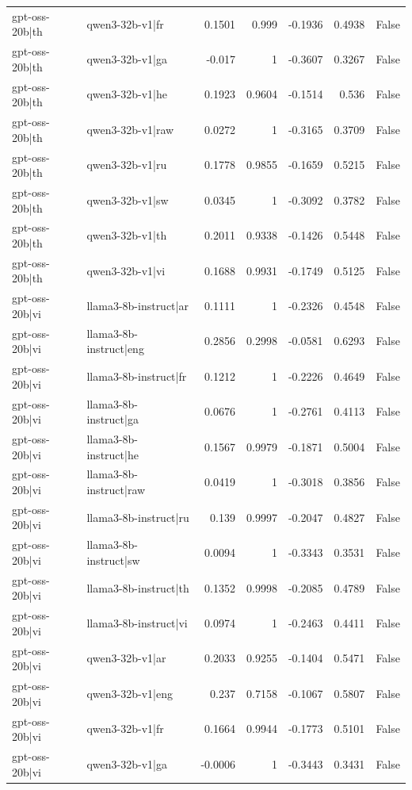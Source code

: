 \begin{table}
\begin{tabular}{l l r r r r l}
gpt-oss-20b|th & qwen3-32b-v1|fr & 0.1501 & 0.999 & -0.1936 & 0.4938 & False \\
gpt-oss-20b|th & qwen3-32b-v1|ga & -0.017 & 1 & -0.3607 & 0.3267 & False \\
gpt-oss-20b|th & qwen3-32b-v1|he & 0.1923 & 0.9604 & -0.1514 & 0.536 & False \\
gpt-oss-20b|th & qwen3-32b-v1|raw & 0.0272 & 1 & -0.3165 & 0.3709 & False \\
gpt-oss-20b|th & qwen3-32b-v1|ru & 0.1778 & 0.9855 & -0.1659 & 0.5215 & False \\
gpt-oss-20b|th & qwen3-32b-v1|sw & 0.0345 & 1 & -0.3092 & 0.3782 & False \\
gpt-oss-20b|th & qwen3-32b-v1|th & 0.2011 & 0.9338 & -0.1426 & 0.5448 & False \\
gpt-oss-20b|th & qwen3-32b-v1|vi & 0.1688 & 0.9931 & -0.1749 & 0.5125 & False \\
gpt-oss-20b|vi & llama3-8b-instruct|ar & 0.1111 & 1 & -0.2326 & 0.4548 & False \\
gpt-oss-20b|vi & llama3-8b-instruct|eng & 0.2856 & 0.2998 & -0.0581 & 0.6293 & False \\
gpt-oss-20b|vi & llama3-8b-instruct|fr & 0.1212 & 1 & -0.2226 & 0.4649 & False \\
gpt-oss-20b|vi & llama3-8b-instruct|ga & 0.0676 & 1 & -0.2761 & 0.4113 & False \\
gpt-oss-20b|vi & llama3-8b-instruct|he & 0.1567 & 0.9979 & -0.1871 & 0.5004 & False \\
gpt-oss-20b|vi & llama3-8b-instruct|raw & 0.0419 & 1 & -0.3018 & 0.3856 & False \\
gpt-oss-20b|vi & llama3-8b-instruct|ru & 0.139 & 0.9997 & -0.2047 & 0.4827 & False \\
gpt-oss-20b|vi & llama3-8b-instruct|sw & 0.0094 & 1 & -0.3343 & 0.3531 & False \\
gpt-oss-20b|vi & llama3-8b-instruct|th & 0.1352 & 0.9998 & -0.2085 & 0.4789 & False \\
gpt-oss-20b|vi & llama3-8b-instruct|vi & 0.0974 & 1 & -0.2463 & 0.4411 & False \\
gpt-oss-20b|vi & qwen3-32b-v1|ar & 0.2033 & 0.9255 & -0.1404 & 0.5471 & False \\
gpt-oss-20b|vi & qwen3-32b-v1|eng & 0.237 & 0.7158 & -0.1067 & 0.5807 & False \\
gpt-oss-20b|vi & qwen3-32b-v1|fr & 0.1664 & 0.9944 & -0.1773 & 0.5101 & False \\
gpt-oss-20b|vi & qwen3-32b-v1|ga & -0.0006 & 1 & -0.3443 & 0.3431 & False \\

\end{tabular}
\end{table}
